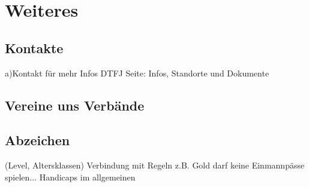 \chapter{Weiteres}

\section{Kontakte}
 a)Kontakt für mehr Infos 
DTFJ Seite: Infos, Standorte und Dokumente

\section{Vereine uns Verbände}


\section{Abzeichen}
 (Level, Altersklassen)
Verbindung mit Regeln z.B. Gold darf keine Einmannpässe spielen...
Handicaps im allgemeinen
